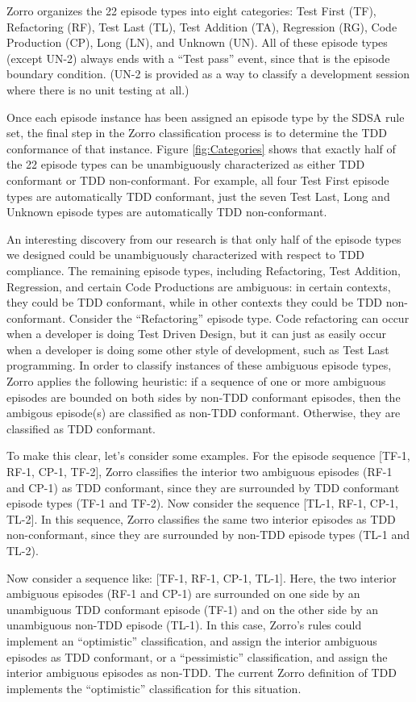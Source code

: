 \documentclass[smallextended]{svjour3}     %
\begin{document}
Zorro organizes the 22 episode types into eight categories: Test First
(TF), Refactoring (RF), Test Last (TL), Test Addition (TA), Regression
(RG), Code Production (CP), Long (LN), and Unknown (UN).  All of these
episode types (except UN-2) always ends with a ``Test pass'' event, since that
is the episode boundary condition.  (UN-2 is provided as a way to classify
a development session where there is no unit testing at all.)

Once each episode instance has been assigned an episode type by the SDSA
rule set, the final step in the Zorro classification process is to
determine the TDD conformance of that instance.  Figure
\ref{fig:Categories} shows that exactly half of the 22 episode types can be
unambiguously characterized as either TDD conformant or TDD non-conformant.
For example, all four Test First episode types are automatically TDD
conformant, just the seven Test Last, Long and Unknown episode
types are automatically TDD non-conformant.

An interesting discovery from our research is that only half of the episode
types we designed could be unambiguously characterized with respect to TDD
compliance.  The remaining episode types, including Refactoring, Test
Addition, Regression, and certain Code Productions are ambiguous: in
certain contexts, they could be TDD conformant, while in other contexts
they could be TDD non-conformant.  Consider the ``Refactoring'' episode
type.  Code refactoring can occur when a developer is doing Test Driven
Design, but it can just as easily occur when a developer is doing some
other style of development, such as Test Last programming.  In order to
classify instances of these ambiguous episode types, Zorro applies the
following heuristic: if a sequence of one or more ambiguous episodes are
bounded on both sides by non-TDD conformant episodes, then the ambigous
episode(s) are classified as non-TDD conformant. Otherwise, they are
classified as TDD conformant.

To make this clear, let's consider some examples.  For the episode sequence
[TF-1, RF-1, CP-1, TF-2], Zorro classifies the interior two ambiguous episodes (RF-1 and
CP-1) as TDD conformant, since they are surrounded by TDD conformant
episode types (TF-1 and TF-2).  Now consider the sequence [TL-1, RF-1,
CP-1, TL-2].  In this sequence, Zorro classifies the same two interior 
episodes as TDD non-conformant, since they are surrounded
by non-TDD episode types (TL-1 and TL-2).

Now consider a sequence like: [TF-1, RF-1, CP-1, TL-1].  Here, the two
interior ambiguous episodes (RF-1 and CP-1) are surrounded on one side by an
unambiguous TDD conformant episode (TF-1) and on the other side by an
unambiguous non-TDD episode (TL-1).  In this case, Zorro's rules
could implement an ``optimistic'' classification, and assign the interior ambiguous
episodes as TDD conformant, or a ``pessimistic'' classification, and assign
the interior ambiguous episodes as non-TDD.  The current Zorro definition
of TDD implements the ``optimistic'' classification for this situation.
\end{document}
